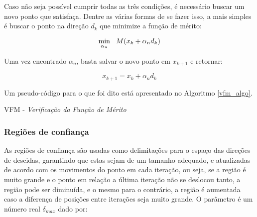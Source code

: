 Caso não seja possível cumprir todas as três condições, é necessário buscar um novo ponto
que satisfaça. Dentre as várias formas de se fazer isso, a mais simples é buscar o ponto
na direção \(d_k\) que minimize a função de mérito:

\begin{equation}
\underset{\alpha_n}{\mathrm{min}} \hspace{0.3cm} M(x_k + \alpha_n d_k)
\end{equation}

Uma vez encontrado \(\alpha_n\), basta salvar o novo ponto em \(x_{k+1}\) e retornar:

\begin{equation}
  x_{k+1} = x_k + \alpha_n d_k
\end{equation}

Um pseudo-código para o que foi dito está apresentado no Algoritmo \ref{vfm_algo}.

\vspace{15pt}
\begin{algorithm}[H]
  \label{vfm_algo}
  \SetAlgoLined
  \caption{VFM - \textit{Verificação da Função de Mérito}}
\end{algorithm}
\vspace{15pt}



\subsubsection{Regiões de confiança}

\noindent
As regiões de confiança são usadas como delimitações para o espaço das direções de descidas,
garantindo que estas sejam de um tamanho adequado, e atualizadas de acordo com os movimentos do
ponto em cada iteração, ou seja, se a região é muito grande e o ponto em relação a última
iteração não se deslocou tanto, a região pode ser diminuída, e o mesmo para o contrário,
a região é aumentada caso a diferença de posições entre iterações seja muito grande. O
parâmetro é um número real \(\delta_{max}\) dado por:

